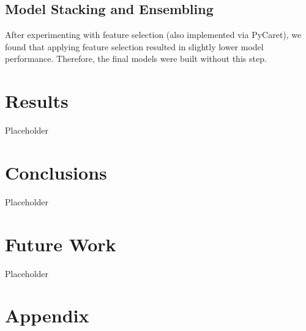 \documentclass[a4paper,12pt]{article}
\begin{document}
\subsection{Model Stacking and Ensembling}
After experimenting with feature selection (also implemented via PyCaret), we found that applying 
feature selection resulted in slightly lower model performance. Therefore, the final models were 
built without this step.

\section{Results}
Placeholder

\section{Conclusions}
Placeholder

\section{Future Work}
Placeholder

\clearpage

\appendix
\section*{Appendix}
\end{document}
